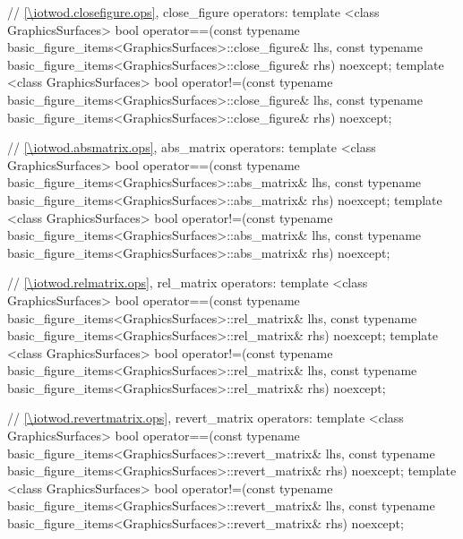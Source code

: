 \begin{codeblock}
{  // \ref{\iotwod.closefigure.ops}, close_figure operators:
  template <class GraphicsSurfaces>
  bool operator==(const typename basic_figure_items<GraphicsSurfaces>::close_figure& lhs,
    const typename basic_figure_items<GraphicsSurfaces>::close_figure& rhs) noexcept;
  template <class GraphicsSurfaces>
  bool operator!=(const typename basic_figure_items<GraphicsSurfaces>::close_figure& lhs,
    const typename basic_figure_items<GraphicsSurfaces>::close_figure& rhs) noexcept;

  // \ref{\iotwod.absmatrix.ops}, abs_matrix operators:
  template <class GraphicsSurfaces>
  bool operator==(const typename basic_figure_items<GraphicsSurfaces>::abs_matrix& lhs,
    const typename basic_figure_items<GraphicsSurfaces>::abs_matrix& rhs) noexcept;
  template <class GraphicsSurfaces>
  bool operator!=(const typename basic_figure_items<GraphicsSurfaces>::abs_matrix& lhs,
    const typename basic_figure_items<GraphicsSurfaces>::abs_matrix& rhs) noexcept;

  // \ref{\iotwod.relmatrix.ops}, rel_matrix operators:
  template <class GraphicsSurfaces>
  bool operator==(const typename basic_figure_items<GraphicsSurfaces>::rel_matrix& lhs,
    const typename basic_figure_items<GraphicsSurfaces>::rel_matrix& rhs) noexcept;
  template <class GraphicsSurfaces>
  bool operator!=(const typename basic_figure_items<GraphicsSurfaces>::rel_matrix& lhs,
    const typename basic_figure_items<GraphicsSurfaces>::rel_matrix& rhs) noexcept;

  // \ref{\iotwod.revertmatrix.ops}, revert_matrix operators:
  template <class GraphicsSurfaces>
  bool operator==(const typename basic_figure_items<GraphicsSurfaces>::revert_matrix& lhs,
    const typename basic_figure_items<GraphicsSurfaces>::revert_matrix& rhs) noexcept;
  template <class GraphicsSurfaces>
  bool operator!=(const typename basic_figure_items<GraphicsSurfaces>::revert_matrix& lhs,
    const typename basic_figure_items<GraphicsSurfaces>::revert_matrix& rhs) noexcept;

}
\end{codeblock}
